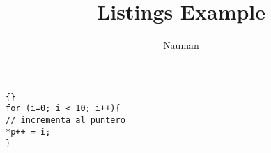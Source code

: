 \documentclass{article}
\begin{document}
\title{Listings Example}
\author{Nauman} 
\maketitle 





\lstset{language=c++}
\lstset{caption=Some Code}
\begin{lstlisting}[frame=single, basicstyle=\ttfamily]{}
for (i=0; i < 10; i++){
// incrementa al puntero
*p++ = i;
}
\end{lstlisting}
\end{document}
